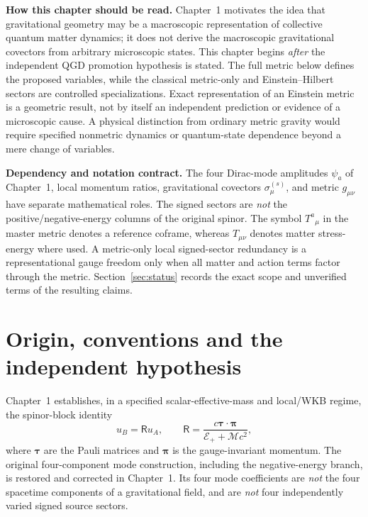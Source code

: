 \documentclass[11pt,a4paper]{article}
\newcommand{\mc}{\mathcal M}
\begin{document}
\tableofcontents


\noindent\textbf{How this chapter should be read.}
Chapter~1 motivates the idea that gravitational geometry may be a macroscopic representation of collective quantum matter dynamics; it does not derive the macroscopic gravitational covectors from arbitrary microscopic states. This chapter begins \emph{after} the independent QGD promotion hypothesis is stated. The full metric below defines the proposed variables, while the classical metric-only and Einstein--Hilbert sectors are controlled specializations. Exact representation of an Einstein metric is a geometric result, not by itself an independent prediction or evidence of a microscopic cause. A physical distinction from ordinary metric gravity would require specified nonmetric dynamics or quantum-state dependence beyond a mere change of variables.

\noindent\textbf{Dependency and notation contract.}
The four Dirac-mode amplitudes $\psi_a$ of Chapter~1, local momentum ratios, gravitational covectors $\sigma_\mu^{(s)}$, and metric $g_{\mu\nu}$ have separate mathematical roles. The signed sectors are \emph{not} the positive/negative-energy columns of the original spinor. The symbol $T^a{}_{\mu}$ in the master metric denotes a reference coframe, whereas $T_{\mu\nu}$ denotes matter stress-energy where used. A metric-only local signed-sector redundancy is a representational gauge freedom only when all matter and action terms factor through the metric. Section~\ref{sec:status} records the exact scope and unverified terms of the resulting claims.

\section{Origin, conventions and the independent hypothesis}\label{sec:origin}
Chapter~1 establishes, in a specified scalar-effective-mass and local/WKB regime, the spinor-block identity
\begin{equation}\label{eq:origin-ratio}
 u_B=\mathsf R u_A,\qquad
 \mathsf R=\frac{c\bm\tau\cdot\bm\pi}{\mathcal E_++\mc c^2},
\end{equation}
where $\bm\tau$ are the Pauli matrices and $\bm\pi$ is the gauge-invariant momentum. The original four-component mode construction, including the negative-energy branch, is restored and corrected in Chapter~1. Its four mode coefficients are \emph{not} the four spacetime components of a gravitational field, and are \emph{not} four independently varied signed source sectors.
\end{document}
